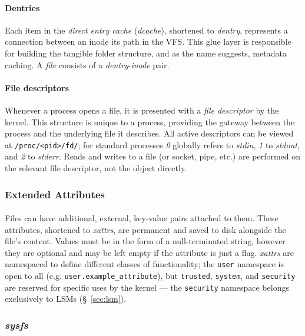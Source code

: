 \paragraph{Dentries} Each item in the \textit{direct entry cache} (\textit{dcache}), shortened to \textit{dentry}, represents a connection between an inode its path in the VFS. This glue layer is responsible for building the tangible folder structure, and as the name suggests, metadata caching. A \textit{file} consists of a \textit{dentry}-\textit{inode} pair.

\paragraph{File descriptors} Whenever a process opens a file, it is presented with a \textit{file descriptor} by the kernel. This structure is unique to a process, providing the gateway between the process and the underlying file it describes. All active descriptors can be viewed at \texttt{/proc/<pid>/fd/}; for standard processes \textit{0} globally refers to \textit{stdin}, \textit{1} to \textit{stdout}, and \textit{2} to \textit{stderr}. Reads and writes to a file (or socket, pipe, etc.) are performed on the relevant file descriptor, not the object directly.

\subsubsection{Extended Attributes} 

\paragraph{} Files can have additional, external, key-value pairs attached to them. These attributes, shortened to \textit{xattrs}, are permanent and saved to disk alongside the file's content. Values must be in the form of a null-terminated string, however they are optional and may be left empty if the attribute is just a flag. \textit{xattrs} are namespaced to define different classes of functionality; the \texttt{user} namespace is open to all (e.g. \texttt{user.example\_attribute}), but \texttt{trusted}, \texttt{system}, and \texttt{security} are reserved for specific uses by the kernel --- the \texttt{security} namespace belongs exclusively to LSMs (§~\ref{sec:lsm}).

\subsubsection{\textit{sysfs}}
